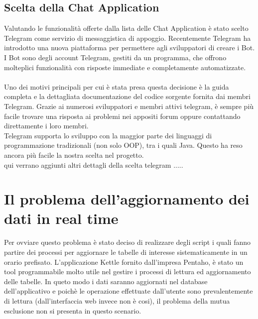 \subsection{Scelta della Chat Application}
Valutando le funzionalità offerte dalla lista delle Chat Application è stato scelto Telegram come servizio di messaggistica di appoggio. Recentemente Telegram ha introdotto una nuova piattaforma per permettere agli sviluppatori di creare i Bot. I Bot sono degli account Telegram, gestiti da un programma, che offrono molteplici funzionalità con risposte immediate e completamente automatizzate. \\\\
Uno dei motivi principali per cui è stata presa questa decisione è la guida completa e la dettagliata documentazione del codice sorgente fornita dai membri Telegram. Grazie ai numerosi sviluppatori e membri attivi telegram, è sempre più facile trovare una risposta ai problemi nei appositi forum oppure contattando direttamente i loro membri.\\ Telegram supporta lo sviluppo con la maggior parte dei linguaggi di programmazione tradizionali (non solo OOP), tra i quali Java. Questo ha reso ancora più facile la nostra scelta nel progetto. \\

qui verrano aggiunti altri dettagli della scelta telegram .....


\section{Il problema dell'aggiornamento dei dati in real time}

Per ovviare questo problema è stato deciso di realizzare degli script i quali fanno partire dei processi per aggiornare le tabelle di interesse sistematicamente in un orario prefisato. L'applicazione Kettle fornito dall'impresa Pentaho, è stato un tool programmabile molto utile nel gestire i processi di lettura ed aggiornamento delle tabelle. In queto modo i dati saranno aggiornati nel database dell'applicativo e poichè le operazione effettuate dall'utente sono prevalentemente di lettura (dall'interfaccia web invece non è cosi), il problema della mutua esclusione  non si presenta in questo scenario. 

